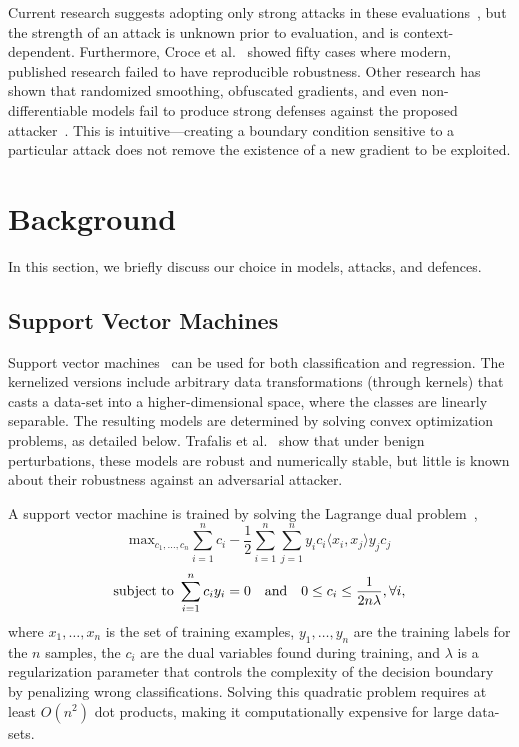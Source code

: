 \documentclass[fonts]{icst}
\begin{document}
Current research suggests adopting only strong attacks in these evaluations~\cite{carlini2019evaluating}, but the strength of an attack is unknown prior to evaluation, and is context-dependent.
Furthermore, Croce et al.~\cite{croce2020reliable} showed fifty cases where modern, published research failed to have reproducible robustness.
Other research has shown that randomized smoothing, obfuscated gradients, and even non-differentiable models fail to produce strong defenses against the proposed attacker~\cite{carlini2017towards,athalye2018obfuscated,uesato2018adversarial}.
This is intuitive---creating a boundary condition sensitive to a particular attack does not remove the existence of a new gradient to be exploited.


\section{Background}
In this section, we briefly discuss our choice in models, attacks, and defences.
\subsection{Support Vector Machines}

Support vector machines~\cite{cortes1995support} can be used for both classification and regression.
The kernelized versions include arbitrary data transformations (through kernels) that casts a data-set into a higher-dimensional space, where the classes are linearly separable.
The resulting models are determined by solving convex optimization problems, as detailed below.
Trafalis et al.~\cite{trafalis2007robust} show that under benign perturbations, these models are robust and numerically stable, but little is known about their robustness against an adversarial attacker.

A support vector machine is trained by solving the Lagrange dual problem~\cite{cortes1995support},
\begin{equation}
    \textrm{max}_{c_1,\ldots,c_n}
    \sum_{i = 1}^n c_i - \frac{1}{2} \sum_{i = 1}^n \sum_{j = 1}^n y_i c_i \langle x_i, x_j \rangle y_j c_j
    \label{eq:linear_svm}
\end{equation}
$$
    \textrm{subject to } \sum_{i = 1}^n c_i y_i = 0 \textrm{\quad and\quad} 0 \leq c_i \leq \frac{1}{2n\lambda}, \forall i,
$$
where $x_1,\ldots,x_n$ is the set of training examples, $y_1,\ldots,y_n$ are the training labels for the $n$ samples, the $c_i$ are the dual variables found during training, and $\lambda$ is a regularization parameter that controls the complexity of the decision boundary by penalizing wrong classifications.
Solving this quadratic problem requires at least $O(n^2)$ dot products, making it computationally expensive for large data-sets.
\end{document}
